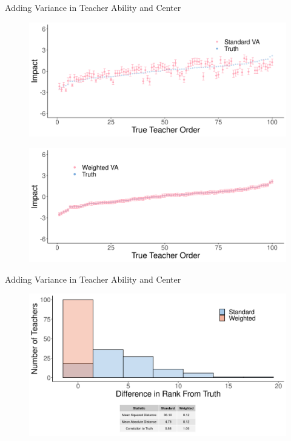 \documentclass[t,aspectratio=169,11pt]{beamer}
\begin{document}
\begin{frame}{Adding Variance in Teacher Ability and Center}

\hypertarget{cat1}{}
\vfill
\begin{subfigure}{.5\textwidth}
  \centering
  \includegraphics[width=\linewidth]{slides/CIERS_Figures/standard_cat_run_4.png}
\end{subfigure}%
\begin{subfigure}{.5\textwidth}
  \centering
  \includegraphics[width=\linewidth]{slides/CIERS_Figures/ww_cat_run_4.png}
\end{subfigure}

\hyperlink{run4}{}

\end{frame}



\begin{frame}{Adding Variance in Teacher Ability and Center}

\hypertarget{hist8}{}
\vfill

\begin{figure}
    \centering
 \includegraphics[width=.75\textwidth]{slides/CIERS_Figures/hist_run_8.png}
\end{figure}

\hyperlink{run4}{}

\end{frame}
\end{document}
